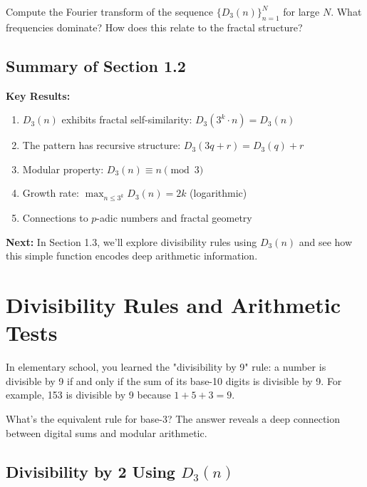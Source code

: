 \begin{exercise}[1.2.12]
Compute the Fourier transform of the sequence $\{D_3(n)\}_{n=1}^{N}$ for large $N$. What frequencies dominate? How does this relate to the fractal structure?
\end{exercise}

\subsection{Summary of Section 1.2}

\textbf{Key Results:}
\begin{enumerate}
\item $D_3(n)$ exhibits fractal self-similarity: $D_3(3^k \cdot n) = D_3(n)$
\item The pattern has recursive structure: $D_3(3q + r) = D_3(q) + r$
\item Modular property: $D_3(n) \equiv n \pmod{3}$
\item Growth rate: $\max_{n \leq 3^k} D_3(n) = 2k$ (logarithmic)
\item Connections to $p$-adic numbers and fractal geometry
\end{enumerate}

\textbf{Next:} In Section 1.3, we'll explore divisibility rules using $D_3(n)$ and see how this simple function encodes deep arithmetic information.

\section{Divisibility Rules and Arithmetic Tests}
\label{sec:divisibility-rules}

In elementary school, you learned the "divisibility by 9" rule: a number is divisible by 9 if and only if the sum of its base-10 digits is divisible by 9. For example, 153 is divisible by 9 because $1 + 5 + 3 = 9$.

What's the equivalent rule for base-3? The answer reveals a deep connection between digital sums and modular arithmetic.

\subsection{Divisibility by 2 Using $D_3(n)$}
\label{subsec:divisibility-by-2}


